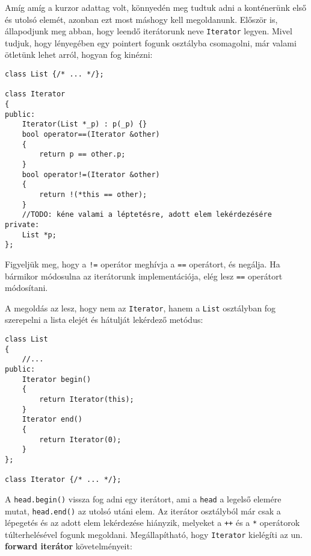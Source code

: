 \documentclass[a4paper,11.5pt,table]{article}
\begin{document}
	Amíg amíg a kurzor adattag volt, könnyedén meg tudtuk adni a konténerünk első és utolsó elemét, azonban ezt most máshogy kell megoldanunk. Először is, állapodjunk meg abban, hogy leendő iterátorunk neve \texttt{Iterator} legyen. Mivel tudjuk, hogy lényegében egy pointert fogunk osztályba csomagolni, már valami ötletünk lehet arról, hogyan fog kinézni:
	\begin{lstlisting}
class List {/* ... */};

class Iterator
{
public:
	Iterator(List *_p) : p(_p) {}
	bool operator==(Iterator &other)
	{
		return p == other.p;
	}
	bool operator!=(Iterator &other)
	{
		return !(*this == other);
	}
	//TODO: kéne valami a léptetésre, adott elem lekérdezésére
private:
	List *p;
};

	\end{lstlisting}
	\begin{note}
		Figyeljük meg, hogy a \texttt{!=} operátor meghívja a \texttt{==} operátort, és negálja. Ha bármikor módosulna az iterátorunk implementációja, elég lesz \texttt{==} operátort módosítani.
	\end{note}
	A megoldás az lesz, hogy nem az \texttt{Iterator}, hanem a \texttt{List} osztályban fog szerepelni a lista elejét és hátulját lekérdező metódus:
	\begin{lstlisting}
class List
{
	//...
public:
	Iterator begin()
	{
		return Iterator(this);
	}
	Iterator end()
	{
		return Iterator(0);
	}
};

class Iterator {/* ... */};
	\end{lstlisting}
	 A \texttt{head.begin()} vissza fog adni egy iterátort, ami a \texttt{head} a legelső elemére mutat, \texttt{head.end()} az utolsó utáni elem. Az iterátor osztályból már csak a lépegetés és az adott elem lekérdezése hiányzik, melyeket a \texttt{++} és a \texttt{*} operátorok túlterhelésével fogunk megoldani. Megállapítható, hogy \texttt{Iterator} kielégíti az un. \textbf{forward iterátor} követelményeit:
\end{document}
